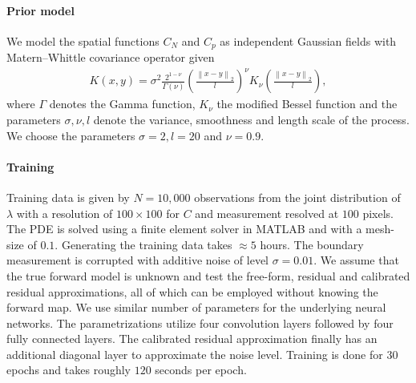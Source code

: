 \documentclass{amsart}
\theoremstyle{definition}
\newcommand{\norm}[1]{\left\|#1\right\|}
\begin{document}
\paragraph{Prior model}
We model the spatial functions $C_N$ and $C_p$ as independent Gaussian fields with Matern–Whittle covariance operator given 
\begin{eqnarray*}
    K(x, y) = \sigma^2 \frac{2^{1-\nu}}{\Gamma(\nu)} \left(\frac{\norm{x-y}_2}{l}\right)^\nu K_\nu\left(\frac{\norm{x-y}_2}{l}\right),
\end{eqnarray*}
where $\Gamma$ denotes the Gamma function, $K_\nu$ the modified Bessel function and the parameters $\sigma, \nu, l$ denote the variance, smoothness and length scale of the process. We choose the parameters $\sigma = 2, l = 20$ and $\nu = 0.9$. 

\paragraph{Training}
Training data is given by $N = 10,000$ observations from the joint distribution of $\lambda$ with a resolution of $100 \times 100$ for $C$ and measurement resolved at $100$ pixels. The PDE is solved using a finite element solver in MATLAB and with a mesh-size of $0.1$. Generating the training data takes $\approx 5$ hours.
The boundary measurement is corrupted with additive noise of level $\sigma = 0.01$. We assume that the true forward model is unknown and test the free-form, residual and calibrated residual approximations, all of which can be employed without knowing the forward map. We use similar number of parameters for the underlying neural networks. The parametrizations utilize four convolution layers followed by four fully connected layers. The calibrated residual approximation finally has an additional diagonal layer to approximate the noise level.
Training is done for 30 epochs and takes roughly $120$ seconds per epoch.
\end{document}
